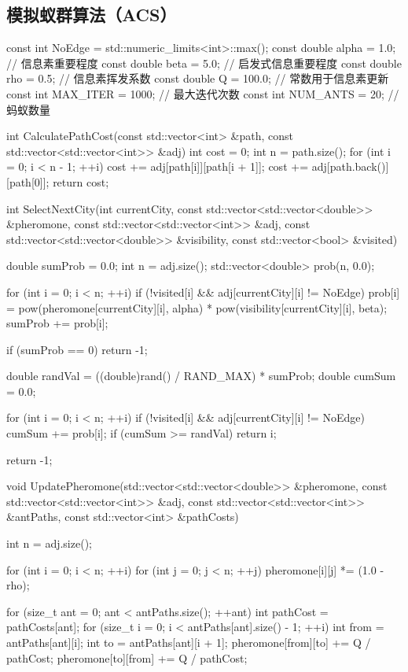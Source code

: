 \subsection{模拟蚁群算法（ACS）}
\begin{cppcode}
const int NoEdge = std::numeric_limits<int>::max();
const double alpha = 1.0; // 信息素重要程度
const double beta = 5.0;  // 启发式信息重要程度
const double rho = 0.5;   // 信息素挥发系数
const double Q = 100.0;   // 常数用于信息素更新
const int MAX_ITER = 1000; // 最大迭代次数
const int NUM_ANTS = 20;   // 蚂蚁数量

int CalculatePathCost(const std::vector<int> &path, const std::vector<std::vector<int>> &adj) {
    int cost = 0;
    int n = path.size();
    for (int i = 0; i < n - 1; ++i) {
        cost += adj[path[i]][path[i + 1]];
    }
    cost += adj[path.back()][path[0]];
    return cost;
}

int SelectNextCity(int currentCity, const std::vector<std::vector<double>> &pheromone,
                   const std::vector<std::vector<int>> &adj, const std::vector<std::vector<double>> &visibility,
                   const std::vector<bool> &visited) {
    double sumProb = 0.0;
    int n = adj.size();
    std::vector<double> prob(n, 0.0);

    for (int i = 0; i < n; ++i) {
        if (!visited[i] && adj[currentCity][i] != NoEdge) {
            prob[i] = pow(pheromone[currentCity][i], alpha) * pow(visibility[currentCity][i], beta);
            sumProb += prob[i];
        }
    }

    if (sumProb == 0) return -1;

    double randVal = ((double)rand() / RAND_MAX) * sumProb;
    double cumSum = 0.0;

    for (int i = 0; i < n; ++i) {
        if (!visited[i] && adj[currentCity][i] != NoEdge) {
            cumSum += prob[i];
            if (cumSum >= randVal) return i;
        }
    }

    return -1;
}

void UpdatePheromone(std::vector<std::vector<double>> &pheromone, const std::vector<std::vector<int>> &adj,
                     const std::vector<std::vector<int>> &antPaths, const std::vector<int> &pathCosts) {
    int n = adj.size();

    for (int i = 0; i < n; ++i) {
        for (int j = 0; j < n; ++j) {
            pheromone[i][j] *= (1.0 - rho);
        }
    }

    for (size_t ant = 0; ant < antPaths.size(); ++ant) {
        int pathCost = pathCosts[ant];
        for (size_t i = 0; i < antPaths[ant].size() - 1; ++i) {
            int from = antPaths[ant][i];
            int to = antPaths[ant][i + 1];
            pheromone[from][to] += Q / pathCost;
            pheromone[to][from] += Q / pathCost;
        }
    }
}


\end{cppcode}
